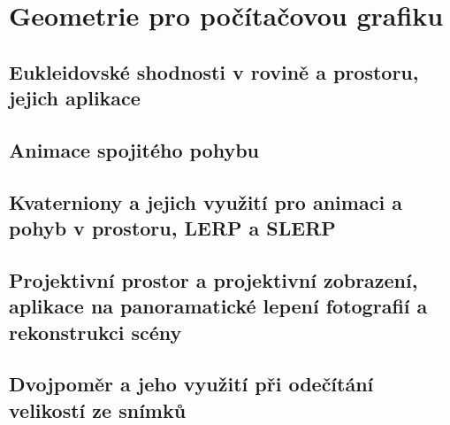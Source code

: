 \documentclass[../../main.tex]{subfiles}
\begin{document}
\section{Geometrie pro počítačovou grafiku}

\subsection{Eukleidovské shodnosti v rovině a prostoru, jejich aplikace}
\subsection{Animace spojitého pohybu}
\subsection{Kvaterniony a jejich využití pro animaci a pohyb v prostoru, LERP a SLERP}
\subsection{Projektivní prostor a projektivní zobrazení, aplikace na panoramatické lepení fotografií a rekonstrukci scény}
\subsection{Dvojpoměr a jeho využití při odečítání velikostí ze snímků}
\end{document}
